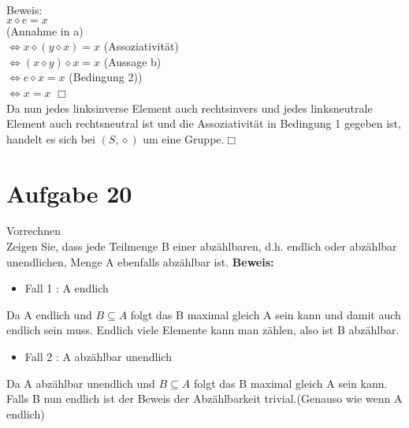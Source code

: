 \documentclass[paper = a4, ngerman]{scrartcl}
\begin{document}
Beweis:\\
$x \diamond e = x$\\ \hspace{10mm} (Annahme in a)\\
$\Leftrightarrow x \diamond (y \diamond x ) = x$ \hspace{10mm} (Assoziativität)\\ 
$\Leftrightarrow (x \diamond y) \diamond x  = x$ \hspace{10mm} (Aussage b)\\ 
$\Leftrightarrow e \diamond x  = x$ \hspace{10mm} (Bedingung 2))\\ 
$\Leftrightarrow x  = x$ \hfill$\Box$\\

Da nun jedes linksinverse Element auch rechtsinvers und jedes linksneutrale Element auch rechtsneutral ist und die Assoziativität in Bedingung 1 gegeben ist, handelt es sich bei $(S, \diamond)$ um eine Gruppe.\hfill$\Box$\\


	
	
\section*{Aufgabe 20}
Vorrechnen\\
Zeigen Sie, dass jede Teilmenge B einer abzählbaren, d.h. endlich oder abzählbar unendlichen, Menge A ebenfalls abzählbar ist.
\textbf{Beweis:}
\begin{itemize}
	\item Fall 1 : A endlich
\end{itemize}
Da A endlich und $B \subseteq A$  folgt das B maximal gleich A sein kann und damit auch endlich sein muss. Endlich viele Elemente kann man zählen, also ist B abzählbar.
\begin{itemize}
	\item Fall 2 : A abzählbar unendlich
\end{itemize}
Da A abzählbar unendlich und $B \subseteq A$  folgt das B maximal gleich A sein kann.\\
Falls B nun endlich ist der Beweis der Abzählbarkeit trivial.(Genauso wie wenn A endlich)\\
\end{document}
